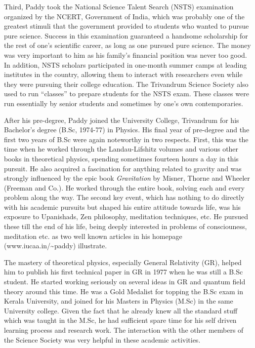 \documentclass[prd, preprint, longbibliography, 11pt]{revtex4-1}
\begin{document}
Third, Paddy took the National Science Talent Search (NSTS)
examination organized by the NCERT, Government of India, which was
probably one of the greatest stimuli that the government provided to
students who wanted to pursue pure science.
Success in this examination guaranteed a handsome scholarship for the
rest of one's scientific career, as long as one pursued pure science.
The money was very important to him as his  family's financial
position was never too good.
In addition, NSTS scholars participated in one-month summer camps at
leading institutes in the country, allowing them to interact with
researchers even while they were pursuing their college education.
The Trivandrum Science Society also used to run ``classes'' to prepare
students for the NSTS exam.
These classes were run essentially by senior students and sometimes by
one's own contemporaries.

After his pre-degree, Paddy joined the University College, Trivandrum
for his Bachelor's degree (B.Sc, 1974-77) in Physics.
His final year of pre-degree and the first two years of B.Sc were
again noteworthy in two respects.
First, this was the time when he worked through the Landau-Lifshitz
volumes and various other books in theoretical physics, spending
sometimes fourteen hours a day in this pursuit.
He also acquired a fascination for anything related to gravity and was
strongly influenced  by the epic book \textit{Gravitation} by Misner,
Thorne and Wheeler (Freeman and Co.).
He worked through the entire book, solving each and every problem
along the way. 
The second key event, which has nothing to do directly with his
academic pursuits but shaped his entire attitude towards life, was his
exposure to Upanishads, Zen philosophy, meditation techniques, etc.
He pursued these till the end of his life, being deeply
interested in problems of consciouness, meditation etc. as two well
known articles in his homepage (www.iucaa.in/\~{}paddy) illustrate.

The mastery of theoretical physics, especially General Relativity
(GR), helped him to publish his first technical paper in GR in 1977
when he was still a B.Sc student.
He started working seriously on several ideas in GR and quantum field
theory around this time.
He was a Gold Medalist for  topping the  B.Sc exam in
Kerala University, and joined for his Masters in Physics (M.Sc) in the
same University college.
Given the fact that he already knew all the standard stuff which was
taught in the M.Sc, he had sufficient spare time for his self driven
learning process and research work.
The interaction with the other members of the Science Society was very
helpful in these academic activities.  
\end{document}
